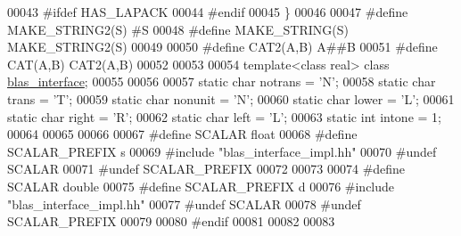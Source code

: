 \begin{DoxyCode}
00043 \textcolor{preprocessor}{#ifdef HAS\_LAPACK}
00044 \textcolor{preprocessor}{#endif}
00045 \}
00046 
00047 \textcolor{preprocessor}{#define MAKE\_STRING2(S) #S}
00048 \textcolor{preprocessor}{#define MAKE\_STRING(S) MAKE\_STRING2(S)}
00049 
00050 \textcolor{preprocessor}{#define CAT2(A,B) A##B}
00051 \textcolor{preprocessor}{#define CAT(A,B) CAT2(A,B)}
00052 
00053 
00054 \textcolor{keyword}{template}<\textcolor{keyword}{class} real> \textcolor{keyword}{class }\hyperlink{classblas__interface}{blas\_interface};
00055 
00056 
00057 \textcolor{keyword}{static} \textcolor{keywordtype}{char} notrans = \textcolor{charliteral}{'N'};
00058 \textcolor{keyword}{static} \textcolor{keywordtype}{char} trans = \textcolor{charliteral}{'T'};
00059 \textcolor{keyword}{static} \textcolor{keywordtype}{char} nonunit = \textcolor{charliteral}{'N'};
00060 \textcolor{keyword}{static} \textcolor{keywordtype}{char} lower = \textcolor{charliteral}{'L'};
00061 \textcolor{keyword}{static} \textcolor{keywordtype}{char} right = \textcolor{charliteral}{'R'};
00062 \textcolor{keyword}{static} \textcolor{keywordtype}{char} left = \textcolor{charliteral}{'L'};
00063 \textcolor{keyword}{static} \textcolor{keywordtype}{int} intone = 1;
00064 
00065 
00066 
00067 \textcolor{preprocessor}{#define SCALAR        float}
00068 \textcolor{preprocessor}{#define SCALAR\_PREFIX s}
00069 \textcolor{preprocessor}{#include "blas\_interface\_impl.hh"}
00070 \textcolor{preprocessor}{#undef SCALAR}
00071 \textcolor{preprocessor}{#undef SCALAR\_PREFIX}
00072 
00073 
00074 \textcolor{preprocessor}{#define SCALAR        double}
00075 \textcolor{preprocessor}{#define SCALAR\_PREFIX d}
00076 \textcolor{preprocessor}{#include "blas\_interface\_impl.hh"}
00077 \textcolor{preprocessor}{#undef SCALAR}
00078 \textcolor{preprocessor}{#undef SCALAR\_PREFIX}
00079 
00080 \textcolor{preprocessor}{#endif}
00081 
00082 
00083 
\end{DoxyCode}
